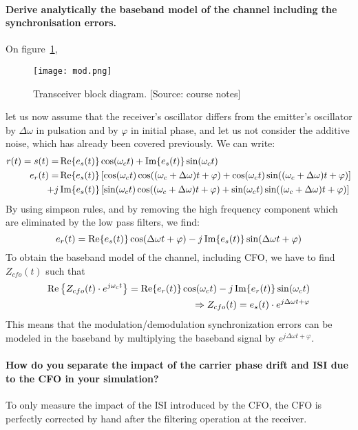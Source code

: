 \paragraph{Derive analytically the baseband model of the channel including the synchronisation errors.}
On figure~\ref{fig:mod},
\begin{figure}
  \centering
  \texttt{[image: mod.png]}
  \caption[Transceiver block diagram.]{Transceiver block diagram. [Source: course notes]\label{fig:mod}}
\end{figure}
let us now assume that the receiver's oscillator differs from the emitter's oscillator by $\Delta \omega$ in pulsation and by $\varphi$ in initial phase, and let us not consider the additive noise, which has already been covered previously.
We can write:
\begin{align*}
  r(t) = s(t) = &\operatorname{Re} \{e_s(t)\} \cos(\omega_c t) + \operatorname{Im} \{e_s(t)\} \sin ( \omega_c t)\\
  e_r(t) = &\operatorname{Re} \{e_s(t)\} \left [ \cos(\omega_c t)\cos((\omega_c + \Delta\omega) t + \varphi) + \cos(\omega_c t)\sin((\omega_c + \Delta\omega) t + \varphi) \right ] \\
  +j &\operatorname{Im} \{e_s(t)\} \left [ \sin(\omega_c t)\cos((\omega_c + \Delta\omega) t + \varphi) + \sin(\omega_c t)\sin((\omega_c + \Delta\omega) t + \varphi) \right ]
\end{align*}
By using simpson rules, and by removing the high frequency component which are eliminated by the low pass filters, we find:
\[
e_r(t) = \operatorname{Re}\{e_s(t)\} \cos(\Delta \omega t + \varphi) - j\operatorname{Im}\{e_s(t)\} \sin(\Delta \omega t + \varphi)
\]
To obtain the baseband model of the channel, including CFO, we have to find $Z_{cfo}(t)$ such that
\begin{align*}
  \operatorname{Re} \left \{Z_{cfo}(t)\cdot e^{j\omega_c t} \right \} = \operatorname{Re}\{e_r(t)\} \cos(\omega_c t) - j \operatorname{Im} \{ e_r(t) \} \sin(\omega_c t)\\
  \Rightarrow Z_{cfo}(t) = e_s(t)\cdot e^{j\Delta \omega t + \varphi}
\end{align*}
This means that the modulation/demodulation synchronization errors can be modeled in the baseband by multiplying the baseband signal by $e^{j\Delta \omega t + \varphi}$.

\paragraph{How do you separate the impact of the carrier phase drift and ISI due to the CFO in your simulation?}
To only measure the impact of the ISI introduced by the CFO, the CFO is perfectly corrected by hand after the filtering operation at the receiver.

